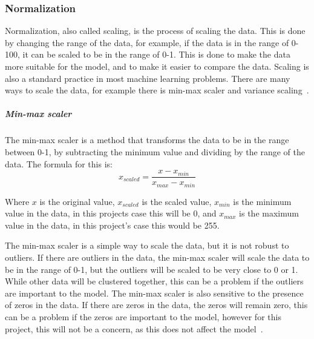 \subsubsection{Normalization}\label{sec:normalization}
Normalization, also called scaling, is the process of scaling the data. This is done by changing the range of the data, for example, if the data is in the range of 0-100, it can be scaled to be in the range of 0-1. This is done to make the data more suitable for the model, and to make it easier to compare the data. Scaling is also a standard practice in most machine learning problems. There are many ways to scale the data, for example there is min-max scaler and variance scaling~\cite{Feature-engineering-zheng}.


\subparagraph{Min-max scaler}\label{subsec:min-max}
The min-max scaler is a method that transforms the data to be in the range between 0-1, by subtracting the minimum value and dividing by the range of the data. The formula for this is:
\begin{equation}
    x_{scaled} = \frac{x - x_{min}}{x_{max} - x_{min}}
\end{equation}

Where $x$ is the original value, $x_{scaled}$ is the scaled value, $x_{min}$ is the minimum value in the data, in this projects case this will be 0, and $x_{max}$ is the maximum value in the data, in this project's case this would be 255. 

The min-max scaler is a simple way to scale the data, but it is not robust to outliers. If there are outliers in the data, the min-max scaler will scale the data to be in the range of 0-1, but the outliers will be scaled to be very close to 0 or 1. While other data will be clustered together, this can be a problem if the outliers are important to the model. The min-max scaler is also sensitive to the presence of zeros in the data. If there are zeros in the data, the zeros will remain zero, this can be a problem if the zeros are important to the model, however for this project, this will not be a concern, as this does not affect the model~\cite{Feature-engineering-zheng}. 


